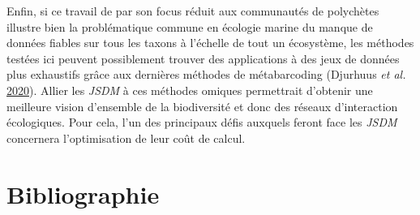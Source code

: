 \documentclass[12pt,]{article}
\begin{document}
Enfin, si ce travail de par son focus réduit aux communautés de
polychètes illustre bien la problématique commune en écologie marine du
manque de données fiables sur tous les taxons à l'échelle de tout un
écosystème, les méthodes testées ici peuvent possiblement trouver des
applications à des jeux de données plus exhaustifs grâce aux dernières
méthodes de métabarcoding (Djurhuus \emph{et al.}
\protect\hyperlink{ref-Djurhuus_2020}{2020}). Allier les \emph{JSDM} à
ces méthodes omiques permettrait d'obtenir une meilleure vision
d'ensemble de la biodiversité et donc des réseaux d'interaction
écologiques. Pour cela, l'un des principaux défis auxquels feront face
les \emph{JSDM} concernera l'optimisation de leur coût de calcul.

\hypertarget{bibliographie}{%
\section{Bibliographie}\label{bibliographie}}
\end{document}
